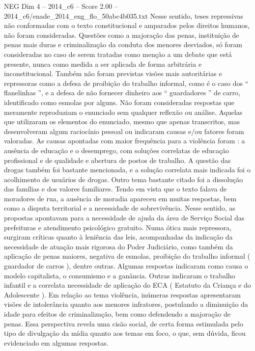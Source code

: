 \begin{textsample}{NEG Dim 4 – 2014\_c6 – Score 2.00 – 2014\_c6/enade\_2014\_eng\_flo\_50abc4b035.txt}
Nesse sentido, teses repressivas não conformadas com o texto constitucional e amparados pelos direitos humanos, não foram consideradas.
Questões como a majoração das penas, instituição de penas mais duras e criminalização da conduta dos menores desviados, só foram consideradas no caso de serem tratadas como menção a um debate que está presente, nunca como medida a ser aplicada de forma arbitrária e inconstitucional.
Também não foram previstas visões mais autoritárias e repressoras como a defesa de proibição do trabalho informal, como é o caso dos “ flanelinhas ”, e a defesa de não fornecer dinheiro aos “ guardadores ” de carro, identificado como esmolas por alguns.
Não foram consideradas respostas que meramente reproduziam o enunciado sem qualquer reflexão ou análise.
Aquelas que utilizaram os elementos do enunciado, mesmo que apenas transcritos, mas desenvolveram algum raciocínio pessoal ou indicaram causas e/ou fatores foram valoradas.
As causas apontadas com maior frequência para a violência foram : a ausência de educação e o desemprego, com soluções correlatas de educação profissional e de qualidade e abertura de postos de trabalho.
A questão das drogas também foi bastante mencionada, e a solução correlata mais indicada foi o acolhimento de usuários de drogas.
Outro tema bastante citado foi a dissolução das famílias e dos valores familiares.
Tendo em vista que o texto falava de moradores de rua, a ausência de moradia apareceu em muitas respostas, bem como a disputa territorial e a necessidade de sobrevivência.
Nesse sentido, as propostas apontavam para a necessidade de ajuda da área de Serviço Social das prefeituras e atendimento psicológico gratuito.
Numa ótica mais repressora, surgiram críticas quanto à leniência das leis, acompanhadas da indicação da necessidade de atuação mais rigorosa do Poder Judiciário, como também da aplicação de penas maiores, negativa de esmolas, proibição do trabalho informal ( guardador de carros ), dentre outras.
Algumas respostas indicaram como causa o modelo capitalista, o consumismo e a ganância.
Outras indicaram o trabalho infantil e a correlata necessidade de aplicação do ECA ( Estatuto da Criança e do Adolescente ).
Em relação ao tema violência, inúmeras respostas apresentaram visões de intolerância quanto aos menores infratores, postulando a diminuição da idade para efeitos de criminalização, bem como defendendo a majoração de penas.
Essa perspectiva revela uma cisão social, de certa forma estimulada pelo tipo de divulgação da mídia quanto aos temas em foco, o que, sem dúvida, ficou evidenciado em algumas respostas.

\end{textsample}
